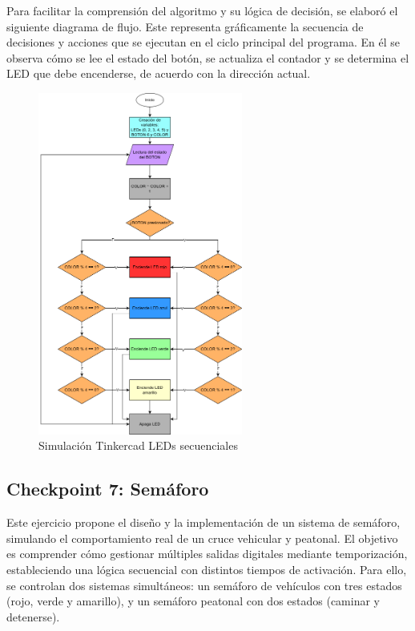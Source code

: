 \documentclass{article}
\begin{document}
Para facilitar la comprensión del algoritmo y su lógica de decisión, se elaboró el siguiente diagrama de flujo. Este representa gr\'aficamente la secuencia de decisiones y acciones que se ejecutan en el ciclo principal del programa. En él se observa cómo se lee el estado del botón, se actualiza el contador y se determina el LED que debe encenderse, de acuerdo con la dirección actual.

\begin{figure}[H]
    \centering
    \includegraphics[width=0.6\textwidth]{./img/ckpt_6_1.png}
    \caption{Simulación Tinkercad LEDs secuenciales}
    \label{fig:leds_secuenciales_flowchart}
\end{figure}

\subsection{Checkpoint 7: Sem\'aforo}

Este ejercicio propone el diseño y la implementación de un sistema de semáforo, simulando el comportamiento real de un cruce vehicular y peatonal. El objetivo es comprender cómo gestionar múltiples salidas digitales mediante temporización, estableciendo una lógica secuencial con distintos tiempos de activación. Para ello, se controlan dos sistemas simultáneos: un semáforo de vehículos con tres estados (rojo, verde y amarillo), y un semáforo peatonal con dos estados (caminar y detenerse).
\end{document}
